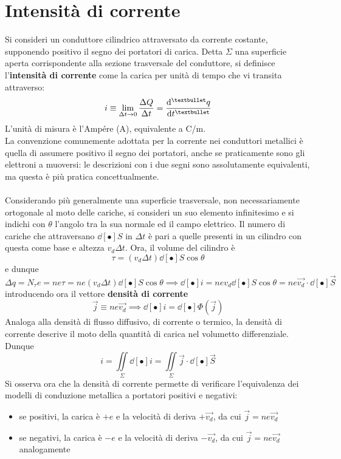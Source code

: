 \section{Intensità di corrente}
Si consideri un conduttore cilindrico attraversato da corrente costante, supponendo positivo il segno dei portatori di carica. Detta $\Sigma$ una superficie aperta corrispondente alla sezione trasversale del conduttore, si definisce l'\textbf{intensità di corrente} come la carica per unità di tempo che vi transita attraverso:
\[i \equiv \limit{\Delta t}{0} \frac{\Delta Q}{\Delta t} = \dv[•]{q}{t}\]
L'unità di misura è l'Ampére (A), equivalente a C/m.
\\La convenzione comunemente adottata per la corrente nei conduttori metallici è quella di assumere positivo il segno dei portatori, anche se praticamente sono gli elettroni a muoversi: le descrizioni con i due segni sono assolutamente equivalenti, ma questa è più pratica concettualmente.
\\~\\
Considerando più generalmente una superficie trasversale, non necessariamente ortogonale al moto delle cariche, si consideri un suo elemento infinitesimo e si indichi con $\theta$ l'angolo tra la sua normale ed il campo elettrico. Il numero di cariche che attraversano $\dd[•]{S}$ in $\Delta t$ è pari a quelle presenti in un cilindro con questa come base e altezza $v_d \Delta t$. Ora, il volume del cilindro è
\[\tau = (v_d \Delta t) \dd[•]{S} \cos \theta\]
e dunque
\[\Delta q = N_\tau e = n e \tau = n e (v_d \Delta t) \dd[•]{S} \cos \theta \implies \dd[•]{i} = n e v_d \dd[•]{S} \cos \theta = n e \vec{v_d} \cdot \dd[•]{\vec{S}}\]
introducendo ora il vettore \textbf{densità di corrente}
\[\vec{j} \equiv n e \vec{v_d} \implies \dd[•]{i} = \dd[•]{\Phi(\vec{j})}\]
Analoga alla densità di flusso diffusivo, di corrente o termico, la densità di corrente descrive il moto della quantità di carica nel volumetto differenziale.
\\Dunque
\[i = \iint\limits_\Sigma \dd[•]{i} = \iint\limits_\Sigma \vec{j} \cdot \dd[•]{\vec{S}}\]
Si osserva ora che la densità di corrente permette di verificare l'equivalenza dei modelli di conduzione metallica a portatori positivi e negativi:
\begin{itemize}
\item se positivi, la carica è $+e$ e la velocità di deriva $+\vec{v_d}$, da cui $\vec{j} = n e \vec{v_d}$
\item se negativi, la carica è $-e$ e la velocità di deriva $-\vec{v_d}$, da cui $\vec{j} = n e \vec{v_d}$ analogamente
\end{itemize}

